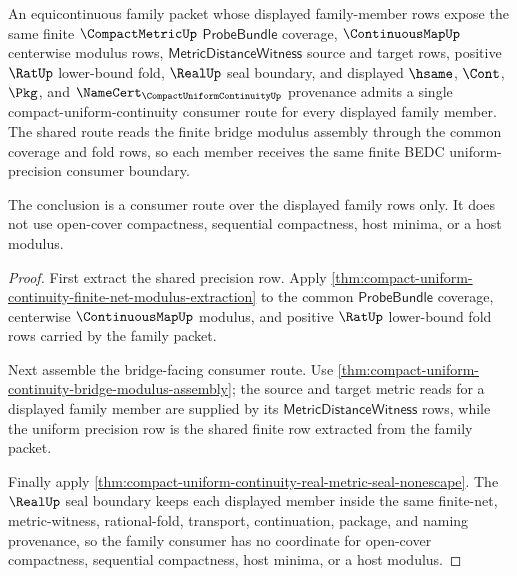 \begin{theorem}
\label{thm:compact-uniform-continuity-equicontinuous-family-consumer}
An equicontinuous family packet whose displayed family-member rows expose the same finite $\CompactMetricUp$ $\mathsf{ProbeBundle}$ coverage, $\ContinuousMapUp$ centerwise modulus rows, $\mathsf{MetricDistanceWitness}$ source and target rows, positive $\RatUp$ lower-bound fold, $\RealUp$ seal boundary, and displayed $\hsame$, $\Cont$, $\Pkg$, and $\NameCert_{\CompactUniformContinuityUp}$ provenance admits a single compact-uniform-continuity consumer route for every displayed family member. The shared route reads the finite bridge modulus assembly through the common coverage and fold rows, so each member receives the same finite BEDC uniform-precision consumer boundary.

The conclusion is a consumer route over the displayed family rows only. It does not use open-cover compactness, sequential compactness, host minima, or a host modulus.
\end{theorem}
\begin{proof}
First extract the shared precision row. Apply \autoref{thm:compact-uniform-continuity-finite-net-modulus-extraction} to the common $\mathsf{ProbeBundle}$ coverage, centerwise $\ContinuousMapUp$ modulus, and positive $\RatUp$ lower-bound fold rows carried by the family packet.

Next assemble the bridge-facing consumer route. Use \autoref{thm:compact-uniform-continuity-bridge-modulus-assembly}; the source and target metric reads for a displayed family member are supplied by its $\mathsf{MetricDistanceWitness}$ rows, while the uniform precision row is the shared finite row extracted from the family packet.

Finally apply \autoref{thm:compact-uniform-continuity-real-metric-seal-nonescape}. The $\RealUp$ seal boundary keeps each displayed member inside the same finite-net, metric-witness, rational-fold, transport, continuation, package, and naming provenance, so the family consumer has no coordinate for open-cover compactness, sequential compactness, host minima, or a host modulus.
\end{proof}

